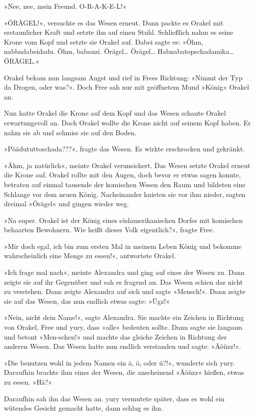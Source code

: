 »Nee, nee, mein Freund. O-R-A-K-E-L!«

»ÖRÄGEL!«, versuchte es das Wesen erneut. Dann packte es Orakel mit erstaunlicher Kraft und setzte ihn auf einen Stuhl. Schließlich nahm es seine Krone vom Kopf und setzte sie Orakel auf. Dabei sagte es: »Öhm, nabbadabeidadu. Öhm, babauzi. Örägel… Örägel… Habnabatopschadamika… ÖRÄGEL.«

Orakel bekam nun langsam Angst und rief in Frees Richtung: »Nimmt der Typ da Drogen, oder was?«. Doch Free sah nur mit geöffnetem Mund »König« Orakel an.

Nun hatte Orakel die Krone auf dem Kopf und das Wesen schaute Orakel erwartungsvoll an. Doch Orakel wollte die Krone nicht auf seinem Kopf haben. Er nahm sie ab und schmiss sie auf den Boden.

»Pöädututtoschada???«, fragte das Wesen. Es wirkte erschrocken und gekränkt.

»Ähm, ja natürlich«, meinte Orakel verunsichert. Das Wesen setzte Orakel erneut die Krone auf. Orakel rollte mit den Augen, doch bevor er etwas sagen konnte, betraten auf einmal tausende der komischen Wesen den Raum und bildeten eine Schlange vor dem neuen König. Nacheinander knieten sie vor ihm nieder, sagten dreimal »Örägel« und gingen wieder weg.

»Na super. Orakel ist der König eines südamerikanischen Dorfes mit komischen behaarten Bewohnern. Wie heißt dieses Volk eigentlich?«, fragte Free.

»Mir doch egal, ich bin zum ersten Mal in meinem Leben König und bekomme wahrscheinlich eine Menge zu essen!«, antwortete Orakel.

»Ich frage mal nach«, meinte Alexandra und ging auf eines der Wesen zu. Dann zeigte sie auf ihr Gegenüber und sah es fragend an. Das Wesen schien das nicht zu verstehen. Dann zeigte Alexandra auf sich und sagte »Mensch!«. Dann zeigte sie auf das Wesen, das nun endlich etwas sagte: »Ügz!«

»Nein, nicht dein Name!«, sagte Alexandra. Sie machte ein Zeichen in Richtung von Orakel, Free und yury, dass »alle« bedeuten sollte. Dann sagte sie langsam und betont »Men‑schen!« und machte das gleiche Zeichen in Richtung der anderen Wesen. Das Wesen hatte nun endlich verstanden und sagte: »Äöüzz!«.

»Die benutzen wohl in jedem Namen ein ä, ö, oder ü?!«, wunderte sich yury. Daraufhin brachte ihm eines der Wesen, die anscheinend »Äöüzz« hießen, etwas zu essen. »Hä?«

Daraufhin sah ihn das Wesen an. yury vermutete später, dass es wohl ein wütendes Gesicht gemacht hatte, dann schlug es ihn.

